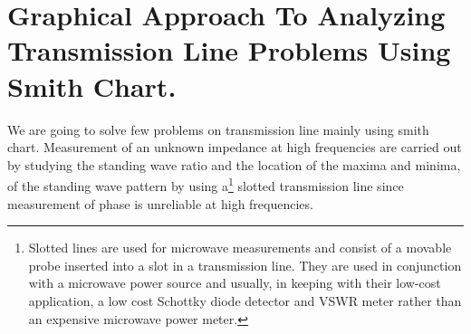 \chapter{Graphical Approach To Analyzing Transmission Line Problems Using Smith Chart.}
We are going to solve few problems on transmission line mainly using smith chart. Measurement of an unknown impedance at high frequencies are carried out by studying the standing wave ratio and the location of the maxima and minima, of the standing wave pattern by using a\footnote{Slotted lines are used for microwave measurements and consist of a movable probe inserted into a slot in a transmission line. They are used in conjunction with a microwave power source and usually, in keeping with their low-cost application, a low cost Schottky diode detector and VSWR meter rather than an expensive microwave power meter.} slotted transmission line since measurement of phase is unreliable at high frequencies.

